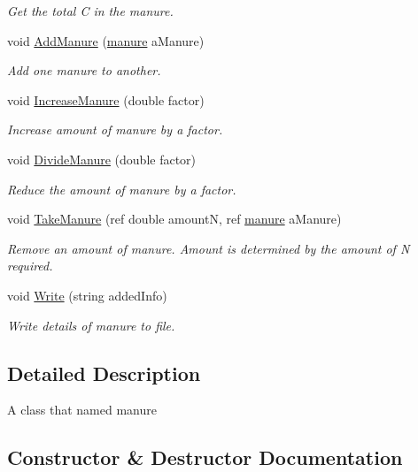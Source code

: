 \begin{DoxyCompactItemize}
\begin{DoxyCompactList}\small\item\em Get the total C in the manure. \end{DoxyCompactList}\item 
void \mbox{\hyperlink{classmanure_aa00f0ac2446502ded3b6c942bbff6c5b}{Add\+Manure}} (\mbox{\hyperlink{classmanure}{manure}} a\+Manure)
\begin{DoxyCompactList}\small\item\em Add one manure to another. \end{DoxyCompactList}\item 
void \mbox{\hyperlink{classmanure_a1410845b6c2f5815fde0170a3af74f6c}{Increase\+Manure}} (double factor)
\begin{DoxyCompactList}\small\item\em Increase amount of manure by a factor. \end{DoxyCompactList}\item 
void \mbox{\hyperlink{classmanure_ab44901c621d6bafa193cb5e60dc18c2b}{Divide\+Manure}} (double factor)
\begin{DoxyCompactList}\small\item\em Reduce the amount of manure by a factor. \end{DoxyCompactList}\item 
void \mbox{\hyperlink{classmanure_a0343f18d1a91ea0e5ba040a3c8d98e15}{Take\+Manure}} (ref double amountN, ref \mbox{\hyperlink{classmanure}{manure}} a\+Manure)
\begin{DoxyCompactList}\small\item\em Remove an amount of manure. Amount is determined by the amount of N required. \end{DoxyCompactList}\item 
void \mbox{\hyperlink{classmanure_a4410908e8e38c56c60ecffd7ee3eeb9a}{Write}} (string added\+Info)
\begin{DoxyCompactList}\small\item\em Write details of manure to file. \end{DoxyCompactList}\end{DoxyCompactItemize}


\subsection{Detailed Description}
A class that named manure 

\subsection{Constructor \& Destructor Documentation}
\mbox{\label{classmanure_af94ebfdf6ee55df1bf6fa835c2318ae3}} 

